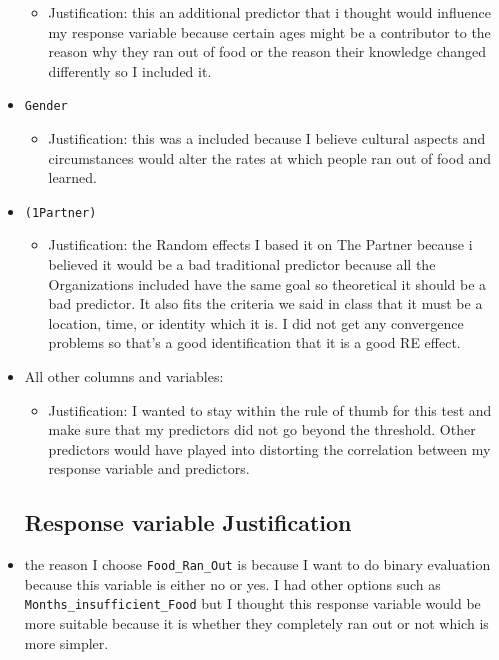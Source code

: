\documentclass[
  letterpaper,
  DIV=11,
  numbers=noendperiod]{scrartcl}
\providecommand{\tightlist}{%
  \setlength{\itemsep}{0pt}\setlength{\parskip}{0pt}}\usepackage{longtable,booktabs,array}
\begin{document}
\begin{itemize}
  \begin{itemize}
  \tightlist
  \item
    Justification: this an additional predictor that i thought would
    influence my response variable because certain ages might be a
    contributor to the reason why they ran out of food or the reason
    their knowledge changed differently so I included it.
  \end{itemize}
\item
  \texttt{Gender}

  \begin{itemize}
  \tightlist
  \item
    Justification: this was a included because I believe cultural
    aspects and circumstances would alter the rates at which people ran
    out of food and learned.
  \end{itemize}
\item
  \texttt{(1\textbar{}Partner)}

  \begin{itemize}
  \tightlist
  \item
    Justification: the Random effects I based it on The Partner because
    i believed it would be a bad traditional predictor because all the
    Organizations included have the same goal so theoretical it should
    be a bad predictor. It also fits the criteria we said in class that
    it must be a location, time, or identity which it is. I did not get
    any convergence problems so that's a good identification that it is
    a good RE effect.
  \end{itemize}
\item
  All other columns and variables:

  \begin{itemize}
  \tightlist
  \item
    Justification: I wanted to stay within the rule of thumb for this
    test and make sure that my predictors did not go beyond the
    threshold. Other predictors would have played into distorting the
    correlation between my response variable and predictors.
  \end{itemize}

  \hypertarget{response-variable-justification}{%
  \subsection{Response variable
  Justification}\label{response-variable-justification}}
\item
  the reason I choose \texttt{Food\_Ran\_Out} is because I want to do
  binary evaluation because this variable is either no or yes. I had
  other options such as \texttt{Months\_insufficient\_Food} but I
  thought this response variable would be more suitable because it is
  whether they completely ran out or not which is more simpler.


\end{itemize}
\end{document}
